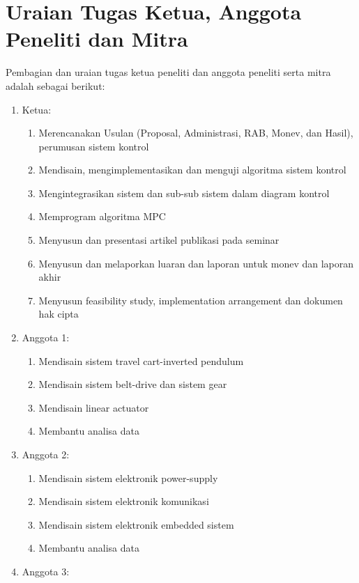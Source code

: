 \section{Uraian Tugas Ketua, Anggota Peneliti dan Mitra}
Pembagian dan uraian tugas ketua peneliti dan anggota peneliti serta mitra adalah sebagai berikut:
\begin{enumerate}
    \item Ketua:
          \begin{enumerate}
              \item Merencanakan Usulan (Proposal, Administrasi, RAB, Monev, dan Hasil), perumusan sistem kontrol
              \item Mendisain, mengimplementasikan dan menguji algoritma sistem kontrol
              \item Mengintegrasikan sistem dan sub-sub sistem dalam diagram kontrol
              \item Memprogram algoritma MPC
              \item Menyusun dan presentasi artikel publikasi pada seminar
              \item Menyusun dan melaporkan luaran dan laporan untuk monev dan laporan akhir
              \item Menyusun feasibility study, implementation arrangement dan dokumen hak cipta
          \end{enumerate}
    \item Anggota 1:
          \begin{enumerate}
              \item Mendisain sistem travel cart-inverted pendulum
              \item Mendisain sistem belt-drive dan sistem gear
              \item Mendisain linear actuator
              \item Membantu analisa data
          \end{enumerate}
    \item Anggota 2:
          \begin{enumerate}
              \item Mendisain sistem elektronik power-supply
              \item Mendisain sistem elektronik komunikasi
              \item Mendisain sistem elektronik embedded sistem
              \item Membantu analisa data
          \end{enumerate}
    \item Anggota 3:

\end{enumerate}
